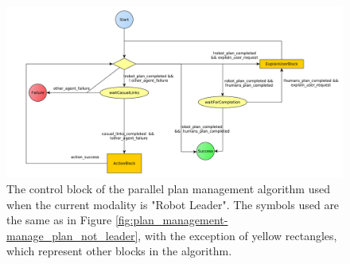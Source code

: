 \begin{figure}[ht!]
 \centering
 \includegraphics[scale=0.45]{img/plan_management/manage_plan_leader_control_block.pdf}
 \caption{The control block of the parallel plan management algorithm used when the current modality is "Robot Leader". The symbols used are the same as in Figure \ref{fig:plan_management-manage_plan_not_leader}, with the exception of yellow rectangles, which represent other blocks in the algorithm.}
 \label{fig:plan_management-manage_plan_leader_control_block}
 \end{figure}


